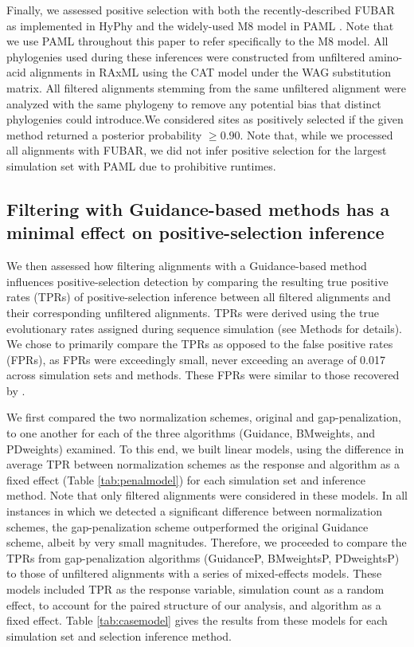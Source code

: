 \documentclass[10pt]{article}
\begin{document}
Finally, we assessed positive selection with both the recently-described FUBAR \citep{Murrell2013} as implemented in HyPhy \citep{Pond2005} and the widely-used M8 model in PAML \citep{Yang2007}. Note that we use PAML throughout this paper to refer specifically to the M8 model.  All phylogenies used during these inferences were constructed from unfiltered amino-acid alignments in RAxML \citep{Stamatakis2006} using the CAT model under the WAG substitution matrix. All filtered alignments stemming from the same unfiltered alignment were analyzed with the same phylogeny to remove any potential bias that distinct phylogenies could introduce.We considered sites as positively selected if the given method returned a posterior probability $\geq0.90$. Note that, while we processed all alignments with FUBAR, we did not infer positive selection for the largest simulation set with PAML due to prohibitive runtimes. 


\subsection*{Filtering with Guidance-based methods has a minimal effect on positive-selection inference}

We then assessed how filtering alignments with a Guidance-based method influences positive-selection detection by comparing the resulting true positive rates (TPRs) of positive-selection inference between all filtered alignments and their corresponding unfiltered alignments. TPRs were derived using the true evolutionary rates assigned during sequence simulation (see Methods for details). We chose to primarily compare the TPRs as opposed to the false positive rates (FPRs), as FPRs were exceedingly small, never exceeding an average of 0.017 across simulation sets and methods. These FPRs were similar to those recovered by \citet{Jordan2012}. 

We first compared the two normalization schemes, original and gap-penalization, to one another for each of the three algorithms (Guidance, BMweights, and PDweights) examined. To this end, we built linear models, using the difference in average TPR between normalization schemes as the response and algorithm as a fixed effect (Table \ref{tab:penalmodel}) for each simulation set and inference method. Note that only filtered alignments were considered in these models. In all instances in which we detected a significant difference between normalization schemes, the gap-penalization scheme outperformed the original Guidance scheme, albeit by very small magnitudes. Therefore, we proceeded to compare the TPRs from gap-penalization algorithms (GuidanceP, BMweightsP, PDweightsP) to those of unfiltered alignments with a series of mixed-effects models. These models included TPR as the response variable, simulation count as a random effect, to account for the paired structure of our analysis, and algorithm as a fixed effect. Table \ref{tab:casemodel} gives the results from these models for each simulation set and selection inference method.
\end{document}

